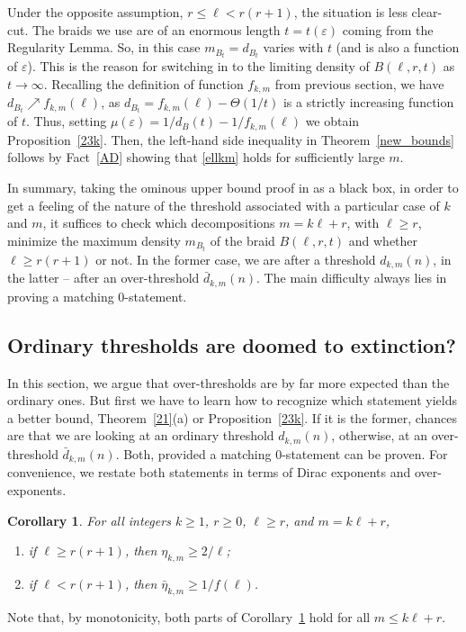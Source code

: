 \documentclass[reqno, 12pt]{amsart}
\numberwithin{equation}{section}
\numberwithin{figure}{section}
\let\epsilon=\varepsilon
\let\eps=\epsilon
\theoremstyle{plain}
\newtheorem{cor}[thm]{Corollary}
\theoremstyle{definition}
\begin{document}
Under the opposite assumption, $r\le\ell<r(r+1)$, the situation is less clear-cut. The  braids we use are of an enormous length $t=t(\eps)$ coming from the Regularity Lemma. So, in this case $m_{B_t}=d_{B_t}$  varies with $t$ (and is also a function of $\eps$). This is the reason for switching in \cite{ADR}  to the limiting density of $B(\ell,r,t)$ as $t\to\infty$. Recalling the definition of function $f_{k,m}$ from previous section, we have $d_{B_t}\nearrow f_{k,m}(\ell)$,
as $d_{B_t}=f_{k,m}(\ell)-\Theta(1/t)$ is a strictly increasing function of $t$. Thus, setting $\mu(\eps)=1/d_B(t)-1/f_{k,m}(\ell)$ we obtain Proposition~\ref{23k}. Then, the left-hand side inequality in Theorem~\ref{new_bounds} follows by Fact~\ref{AD} showing that \eqref{ellkm} holds for sufficiently large $m$.

\medskip

In summary, taking the ominous upper bound proof in \cite{ADRRS} as a black box, in order to get a feeling of the nature of the threshold associated with a particular case of $k$ and $m$, it suffices to check which decompositions $m=k\ell+r$, with $\ell\ge r$,
minimize the maximum density $m_{B_t}$ of the braid $B(\ell,r,t)$ and whether $\ell\ge r(r+1)$ or not. In the former case, we are after a threshold $d_{k,m}(n)$, in the latter -- after an over-threshold $\bar d_{k,m}(n)$. The main difficulty always lies in proving a matching 0-statement.


\subsection{Ordinary thresholds are doomed to extinction?}\label{extinct}

In this section, we argue that over-thresholds are by far more expected than the ordinary ones.  But first we have to learn how to recognize which statement yields a better bound, Theorem~\ref{21}(a) or Proposition~\ref{23k}. If it is the former, chances are that we are looking at an ordinary threshold $d_{k,m}(n)$, otherwise, at an over-threshold $\bar d_{k,m}(n)$. Both, provided a matching 0-statement can be proven. %
For convenience, we restate both statements in terms of Dirac exponents and over-exponents.

\begin{cor}\label{2cases} For all integers $k\geq 1$, $r\geq 0$, $\ell\ge r$, and $m=k\ell+r$,
\begin{enumerate}
    \item if $\ell\geq r(r+1)$, then $\eta_{k, m}\ge 2/\ell$; \label{cond:thresh}
    \item if $\ell<r(r+1)$, then $\bar\eta_{k,m}\ge 1/f(\ell)$. \label{cond:over_thresh}
\end{enumerate}
\end{cor}
\noindent Note that, by monotonicity, both parts of Corollary~\ref{2cases} hold for all $m\le k\ell+r$.
\end{document}

